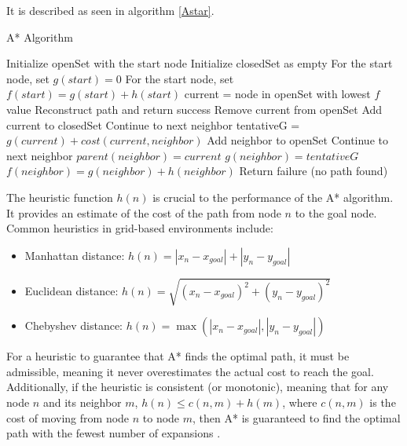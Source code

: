 \documentclass{kththesis}
\begin{document}
It is described as seen in algorithm \ref{Astar}.

\begin{algorithm}
\caption{A* Algorithm}
\label{Astar}
\begin{algorithmic}[1]
\State Initialize openSet with the start node
\State Initialize closedSet as empty
\State For the start node, set $g(start) = 0$
\State For the start node, set $f(start) = g(start) + h(start)$ 
    \State current = node in openSet with lowest $f$ value
        \State Reconstruct path and return success
    \EndIf
    \State Remove current from openSet
    \State Add current to closedSet
            \State Continue to next neighbor
        \EndIf
        \State tentativeG = $g(current) + cost(current, neighbor)$
            \State Add neighbor to openSet
            \State Continue to next neighbor
        \EndIf
        \State $parent(neighbor) = current$
        \State $g(neighbor) = tentativeG$
        \State $f(neighbor) = g(neighbor) + h(neighbor)$
    \EndFor
\EndWhile
\State Return failure (no path found)
\end{algorithmic}
\end{algorithm}

The heuristic function $h(n)$ is crucial to the performance of the A* algorithm. It provides an estimate of the cost of the path from node $n$ to the goal node. Common heuristics in grid-based environments include:

\begin{itemize}
    \item Manhattan distance: $h(n) = |x_n - x_{goal}| + |y_n - y_{goal}|$
    \item Euclidean distance: $h(n) = \sqrt{(x_n - x_{goal})^2 + (y_n - y_{goal})^2}$
    \item Chebyshev distance: $h(n) = \max(|x_n - x_{goal}|, |y_n - y_{goal}|)$ 
\end{itemize}

For a heuristic to guarantee that A* finds the optimal path, it must be admissible, meaning it never overestimates the actual cost to reach the goal. Additionally, if the heuristic is consistent (or monotonic), meaning that for any node $n$ and its neighbor $m$, $h(n) \leq c(n, m) + h(m)$, where $c(n, m)$ is the cost of moving from node $n$ to node $m$, then A* is guaranteed to find the optimal path with the fewest number of expansions \parencite{Hart68}.
\end{document}
